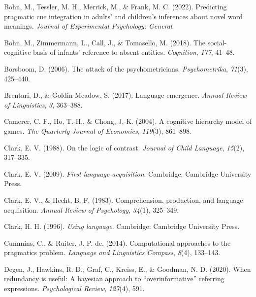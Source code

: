 \documentclass[
  man,floatsintext]{apa6}
\newlength{\cslhangindent}
\newlength{\cslentryspacingunit} %
\newenvironment{CSLReferences}[2] %
 {%
  \setlength{\parindent}{0pt}
  \ifodd #1
  \let\oldpar\par
  \def\par{\hangindent=\cslhangindent\oldpar}
  \fi
  \setlength{\parskip}{#2\cslentryspacingunit}
 }%
 {}
\begin{document}
\begin{CSLReferences}{1}{0}
\leavevmode{}%
Bohn, M., Tessler, M. H., Merrick, M., \& Frank, M. C. (2022). Predicting pragmatic cue integration in adults' and children's inferences about novel word meanings. \emph{Journal of Experimental Psychology: General}.

\leavevmode{}%
Bohn, M., Zimmermann, L., Call, J., \& Tomasello, M. (2018). The social-cognitive basis of infants' reference to absent entities. \emph{Cognition}, \emph{177}, 41--48.

\leavevmode{}%
Borsboom, D. (2006). The attack of the psychometricians. \emph{Psychometrika}, \emph{71}(3), 425--440.

\leavevmode{}%
Brentari, D., \& Goldin-Meadow, S. (2017). Language emergence. \emph{Annual Review of Linguistics}, \emph{3}, 363--388.

\leavevmode{}%
Camerer, C. F., Ho, T.-H., \& Chong, J.-K. (2004). A cognitive hierarchy model of games. \emph{The Quarterly Journal of Economics}, \emph{119}(3), 861--898.

\leavevmode{}%
Clark, E. V. (1988). On the logic of contrast. \emph{Journal of Child Language}, \emph{15}(2), 317--335.

\leavevmode{}%
Clark, E. V. (2009). \emph{First language acquisition}. Cambridge: Cambridge University Press.

\leavevmode{}%
Clark, E. V., \& Hecht, B. F. (1983). Comprehension, production, and language acquisition. \emph{Annual Review of Psychology}, \emph{34}(1), 325--349.

\leavevmode{}%
Clark, H. H. (1996). \emph{Using language}. Cambridge: Cambridge University Press.

\leavevmode{}%
Cummins, C., \& Ruiter, J. P. de. (2014). Computational approaches to the pragmatics problem. \emph{Language and Linguistics Compass}, \emph{8}(4), 133--143.

\leavevmode{}%
Degen, J., Hawkins, R. D., Graf, C., Kreiss, E., \& Goodman, N. D. (2020). When redundancy is useful: A bayesian approach to {``overinformative''} referring expressions. \emph{Psychological Review}, \emph{127}(4), 591.


\end{CSLReferences}
\end{document}

